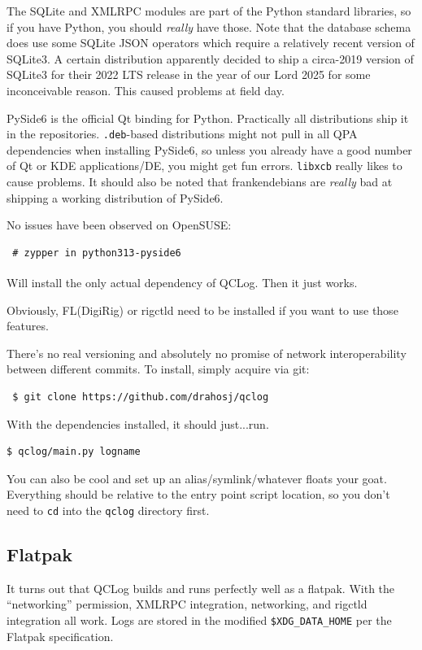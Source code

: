 \documentclass[a4paper,10pt]{article}
\begin{document}
The SQLite and XMLRPC modules are part of the Python standard libraries, so if
you have Python, you should \emph{really} have those. Note that the database schema
does use some SQLite JSON operators which require a relatively recent version
of SQLite3. A certain distribution apparently decided to ship a circa-2019 version of SQLite3
for their 2022 LTS release in the year of our Lord 2025 for some inconceivable reason.
This caused problems at field day.

PySide6 is the official Qt binding for Python. Practically all distributions ship
it in the repositories. \texttt{.deb}-based distributions might not pull in all QPA
dependencies when installing PySide6, so unless you already have a good number of
Qt or KDE applications/DE, you might get fun errors. \texttt{libxcb} really likes
to cause problems. It should also be noted that frankendebians are \emph{really} bad
at shipping a working distribution of PySide6.

No issues have been observed on OpenSUSE:

\begin{verbatim}
 # zypper in python313-pyside6
\end{verbatim}

Will install the only actual dependency of QCLog. Then it just works\textsuperscript{\texttrademark}.

Obviously, FL(Digi\textpipe Rig) or rigctld need to be installed if you want to use those
features.

There's no real versioning and absolutely no promise of network interoperability between
different commits. To install, simply acquire via git:

\begin{verbatim}
 $ git clone https://github.com/drahosj/qclog
\end{verbatim}

With the dependencies installed, it should just...run.

\begin{verbatim}
$ qclog/main.py logname
\end{verbatim}

You can also be cool and set up an alias/symlink/whatever floats your goat. Everything should be
relative to the entry point script location, so you don't need to \texttt{cd} into the
\texttt{qclog} directory first.

\subsection{Flatpak}
It turns out that QCLog builds and runs perfectly well as a flatpak. With the ``networking'' permission,
XMLRPC integration, networking, and rigctld integration all work. Logs are stored in the modified
\texttt{\$XDG\_DATA\_HOME} per the Flatpak specification.
\end{document}
